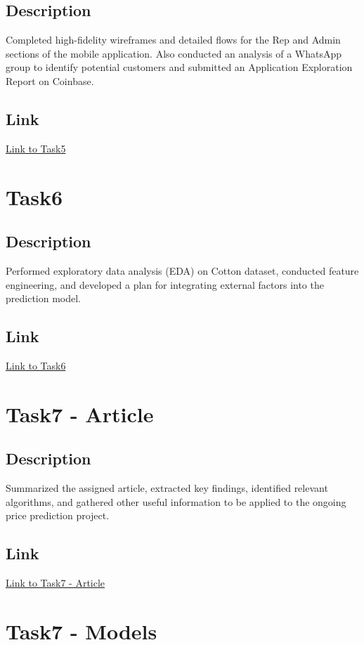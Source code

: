 \documentclass[12pt]{article}
\begin{document}
\subsection{Description}
Completed high-fidelity wireframes and detailed flows for the Rep and Admin sections of the mobile application. Also conducted an analysis of a WhatsApp group to identify potential customers and submitted an Application Exploration Report on Coinbase.

\subsection{Link}
\href{https://github.com/msaadg/PAR-Project/tree/main/Task5}{Link to Task5}

\section{Task6}
\subsection{Description}
Performed exploratory data analysis (EDA) on Cotton dataset, conducted feature engineering, and developed a plan for integrating external factors into the prediction model.

\subsection{Link}
\href{https://github.com/msaadg/PAR-Project/tree/main/Task6}{Link to Task6}

\section{Task7 - Article}
\subsection{Description}
Summarized the assigned article, extracted key findings, identified relevant algorithms, and gathered other useful information to be applied to the ongoing price prediction project.

\subsection{Link}
\href{#}{Link to Task7 - Article}

\section{Task7 - Models}
\end{document}
